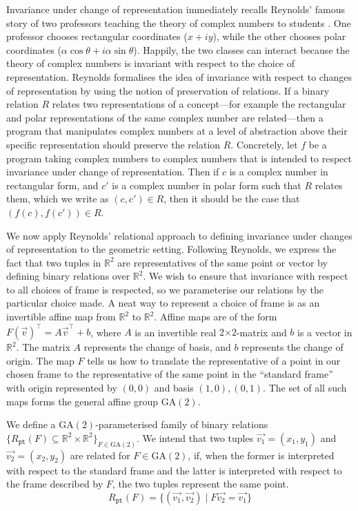 \documentclass{article}
\newcommand{\sepbar}{\mathrel|}
\newcommand{\GA}{\mathrm{GA}}
\begin{document}
Invariance under change of representation immediately recalls
Reynolds' famous story of two professors teaching the theory of
complex numbers to students \cite{reynolds83types}. One professor
chooses rectangular coordinates ($x + iy$), while the other chooses
polar coordinates ($\alpha\cos\theta + i\alpha\sin\theta$). Happily,
the two classes can interact because the theory of complex numbers is
invariant with respect to the choice of representation. Reynolds
formalises the idea of invariance with respect to changes of
representation by using the notion of preservation of relations. If a
binary relation $R$ relates two representations of a concept---for
example the rectangular and polar representations of the same complex
number are related---then a program that manipulates complex numbers
at a level of abstraction above their specific representation should
preserve the relation $R$. Concretely, let $f$ be a program taking
complex numbers to complex numbers that is intended to respect
invariance under change of representation. Then if $c$ is a complex
number in rectangular form, and $c'$ is a complex number in polar form
such that $R$ relates them, which we write as $(c,c') \in R$, then it
should be the case that $(f(c), f(c')) \in R$.

We now apply Reynolds' relational approach to defining invariance
under changes of representation to the geometric setting. Following
Reynolds, we express the fact that two tuples in $\mathbb{R}^2$ are
representatives of the same point or vector by defining binary
relations over $\mathbb{R}^2$. We wish to ensure that invariance with
respect to all choices of frame is respected, so we parameterise our
relations by the particular choice made. A neat way to represent a
choice of frame is as an invertible affine map from $\mathbb{R}^2$ to
$\mathbb{R}^2$. Affine maps are of the form $F(\vec{v})^\top =
A\vec{v}^\top + b$, where $A$ is an invertible real $2 \mathord\times
2$-matrix and $b$ is a vector in $\mathbb{R}^2$. The matrix $A$
represents the change of basis, and $b$ represents the change of
origin. The map $F$ tells us how to translate the representative of a
point in our chosen frame to the representative of the same point in
the ``standard frame'' with origin represented by $(0,0)$ and basis
$(1,0),(0,1)$. The set of all such maps forms the general affine group
$\GA(2)$.

We define a $\GA(2)$-parameterised family of binary relations $\{
R_{\texttt{pt}}(F) \subseteq \mathbb{R}^2 \times \mathbb{R}^2 \}_{F
  \in \GA(2)}$. We intend that two tuples $\vec{v_1} = (x_1,y_1)$ and
$\vec{v_2} = (x_2,y_2)$ are related for $F \in \GA(2)$, if, when the
former is interpreted with respect to the standard frame and the
latter is interpreted with respect to the frame described by $F$, the
two tuples represent the same point.
\begin{displaymath}
  R_{\texttt{pt}}(F) = \{ (\vec{v_1}, \vec{v_2}) \sepbar F\vec{v_2} = \vec{v_1} \}
\end{displaymath}
\end{document}

